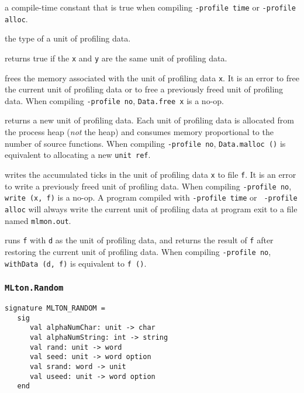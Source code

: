 \begin{description}

a compile-time constant that is true when compiling {\tt -profile
time} or {\tt -profile alloc}.

 the type of a unit of profiling data.

returns true if the {\tt x} and {\tt y} are the same unit of profiling
data.

frees the memory associated with the unit of profiling data {\tt x}.
It is an error to free the current unit of profiling data or to free a
previously freed unit of profiling data.  When compiling {\tt -profile
no}, {\tt Data.free x} is a no-op.

returns a new unit of profiling data.  Each unit of profiling data is
allocated from the process heap (\emph{not} the {\mlton} heap) and
consumes memory proportional to the number of source functions.  When
compiling {\tt -profile no}, {\tt Data.malloc ()} is equivalent to
allocating a new {\tt unit ref}.

writes the accumulated ticks in the unit of profiling data {\tt x} to
file {\tt f}.  It is an error to write a previously freed unit of
profiling data.  When compiling {\tt -profile no}, {\tt write (x, f)}
is a no-op.  A program compiled with {\tt -profile time} or {\tt
-profile alloc} will always write the current unit of profiling data
at program exit to a file named {\tt mlmon.out}.

runs {\tt f} with {\tt d} as the unit of profiling data, and returns
the result of {\tt f} after restoring the current unit of profiling
data.  When compiling {\tt -profile no}, {\tt withData (d, f)} is
equivalent to {\tt f ()}.

\end{description}
%
\subsubsection{\tt MLton.Random}

\begin{verbatim}
signature MLTON_RANDOM =
   sig
      val alphaNumChar: unit -> char
      val alphaNumString: int -> string
      val rand: unit -> word
      val seed: unit -> word option
      val srand: word -> unit
      val useed: unit -> word option
   end
\end{verbatim}

